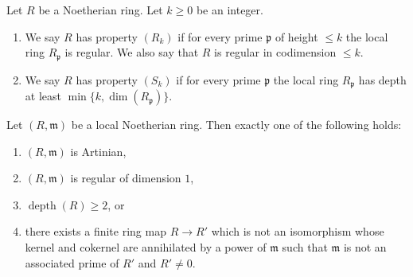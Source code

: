\begin{definition}
Let $R$ be a Noetherian ring. Let $k\geq0$ be an integer.
\begin{enumerate}
\item We say $R$ has property $(R_k)$ if for every prime $\mathfrak p$ of height $\leq k$ the local ring $R_{\mathfrak p}$ is regular. We also say that $R$ is regular in codimension $\leq k$.
\item We say $R$ has property $(S_k)$ if for every prime $\mathfrak p$ the local ring $R_{\mathfrak p}$ has depth at least $\min\{k,\dim(R_{\mathfrak p})\}$.
\end{enumerate}
\end{definition}

\begin{lemma}
Let $(R,\mathfrak m)$ be a local Noetherian ring. Then exactly one of the following holds:
\begin{enumerate}
\item $(R,\mathfrak m)$ is Artinian,
\item $(R,\mathfrak m)$ is regular of dimension $1$,
\item $\operatorname{depth}(R)\geq2$, or
\item there exists a finite ring map $R\to R'$ which is not an isomorphism whose kernel and cokernel are annihilated by a power of $\mathfrak m$ such that $\mathfrak m$ is not an associated prime of $R'$ and $R'\ne0$.
\end{enumerate}
\end{lemma}
